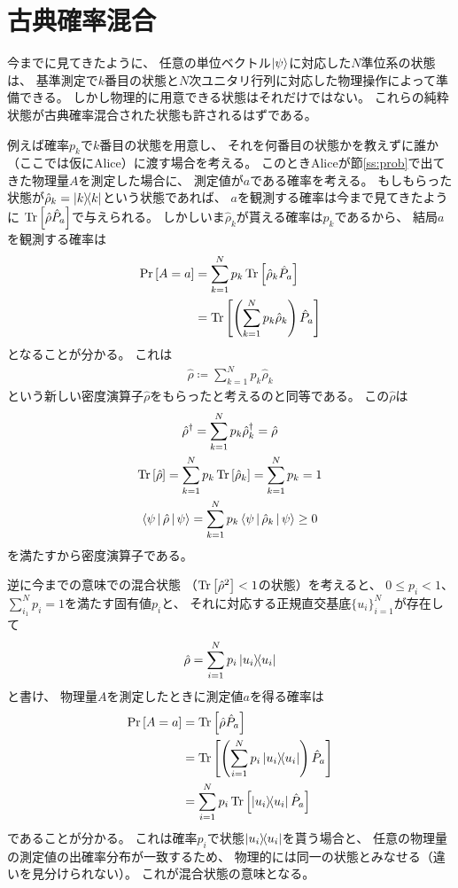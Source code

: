 \documentclass[a4paper, 10pt]{jsarticle}
\begin{document}
\section{古典確率混合}
今までに見てきたように、
任意の単位ベクトル$\Ket{\psi}$に対応した$N$準位系の状態は、
基準測定で$k$番目の状態と$N$次ユニタリ行列に対応した物理操作によって準備できる。
しかし物理的に用意できる状態はそれだけではない。
これらの純粋状態が古典確率混合された状態も許されるはずである。

例えば確率$p_k$で$k$番目の状態を用意し、
それを何番目の状態かを教えずに誰か（ここでは仮にAlice）に渡す場合を考える。
このときAliceが節\ref{ss:prob}で出てきた物理量$A$を測定した場合に、
測定値が$a$である確率を考える。
もしもらった状態が$\hat{\rho}_k = \Ket{k} \! \! \Bra{k}$という状態であれば、
$a$を観測する確率は今まで見てきたように
$\operatorname*{Tr} \left[ \hat{\rho} \hat{P}_a \right]$で与えられる。
しかしいま$\hat{\rho}_k$が貰える確率は$p_k$であるから、
結局$a$を観測する確率は
\begin{align}
	\Pr \left[ A = a \right]
	&= \sum_{k=1}^{N} p_k \operatorname*{Tr} \left[ \hat{\rho}_k \hat{P}_a \right] \\
	&= \operatorname*{Tr} \left[ \left( 
		\sum_{k=1}^{N} p_k \hat{\rho}_k
	 \right) \hat{P}_a \right]
\end{align}
となることが分かる。
これは
\begin{gather}
	\hat{\rho} \coloneqq \sum_{k=1}^{N} p_k \hat{\rho}_k
\end{gather}
という新しい密度演算子$\hat{\rho}$をもらったと考えるのと同等である。
この$\hat{\rho}$は
\begin{gather}
	\hat{\rho}^{\dagger} = \sum_{k=1}^{N} p_k \hat{\rho}_k^{\dagger}
	= \hat{\rho} \\
	\operatorname*{Tr} \left[ \hat{\rho} \right]
	= \sum_{k=1}^{N} p_k \operatorname*{Tr} \left[ \hat{\rho}_k \right]
	= \sum_{k=1}^{N} p_k = 1 \\
	\Braket{\psi | \hat{\rho} | \psi}
	= \sum_{k=1}^{N} p_k \Braket{\psi | \hat{\rho}_k | \psi}
	\geq 0
\end{gather}
を満たすから密度演算子である。

逆に今までの意味での混合状態
（$\operatorname*{Tr} \left[ \hat{\rho}^2 \right] < 1$の状態）を考えると、
$0 \leq p_i < 1$、$\sum_{i_1}^{N} p_i = 1$を満たす固有値$p_i$と、
それに対応する正規直交基底$\{ u_i \}_{i=1}^N$が存在して
\begin{gather}
	\hat{\rho} = \sum_{i=1}^N p_i \Ket{u_i} \! \! \Bra{u_i}
\end{gather}
と書け、
物理量$A$を測定したときに測定値$a$を得る確率は
\begin{align}
	\Pr \left[ A = a \right]
	&= \operatorname*{Tr} \left[ \hat{\rho} \hat{P}_a \right] \\
	&= \operatorname*{Tr} \left[ \left( \sum_{i=1}^{N} p_i \Ket{u_i} \! \! \Bra{u_i} \right)
	\hat{P}_a \right] \\
	&= \sum_{i=1}^N p_i \operatorname*{Tr} \left[ \Ket{u_i} \! \! \Bra{u_i} \hat{P}_a \right]
\end{align}
であることが分かる。
これは確率$p_i$で状態$\Ket{u_i} \! \! \Bra{u_i}$を貰う場合と、
任意の物理量の測定値の出確率分布が一致するため、
物理的には同一の状態とみなせる（違いを見分けられない）。
これが混合状態の意味となる。
\end{document}
